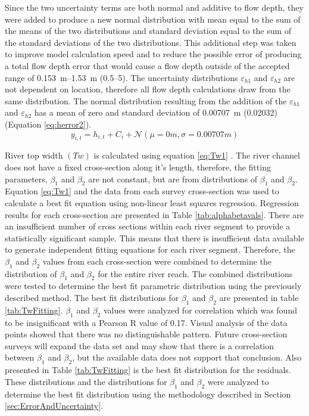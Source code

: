 Since the two uncertainty terms are both normal and additive to flow depth, they were added to produce a new normal distribution with mean equal to the sum of the means of the two distributions and standard deviation equal to the sum of the standard deviations of the two distributions.  This additional step was taken to improve model calculation speed and to reduce the possible error of producing a total flow depth error that would cause a flow depth outside of the accepted range of \SIrange{0.153}{1.53}{\meter} (\SIrange{0.5}{5}{\foot}).  The uncertainty distributions $ \varepsilon_{h1} $ and $ \varepsilon_{h2} $ are not dependent on location, therefore all flow depth calculations draw from the same distribution.  The normal distribution resulting from the addition of the $ \varepsilon_{h1} $ and $ \varepsilon_{h2} $ has a mean of zero and standard deviation of \SI{0.00707}{\meter} (\SI{0.02032}{\foot}) (Equation \ref{eq:herror2}).  
\begin{equation}
	y_{i,t}=h_{i,t}+C_{i}+\mathcal{N} \left( \mu=0m, \sigma=0.00707m \right)
	\label{eq:herror2}
\end{equation}

River top width $ \left( Tw \right)  $ is calculated using equation \ref{eq:Tw1}  \parencite{Buhman2002,Gates1996}. The river channel does not have a fixed cross-section along it's length, therefore, the fitting parameters, $ \beta_1 $ and $ \beta_2 $ are not constant, but are from distributions of  $ \beta_1 $ and $ \beta_2 $.  Equation \ref{eq:Tw1} and the data from each survey cross-section was used to calculate a best fit equation using non-linear least squares regression.  Regression results for each cross-section are presented in Table \ref{tab:alphabetavals}.  There are an insufficient number of cross sections within each river segment to provide a statistically significant sample.  This means that there is insufficient data available to generate independent fitting equations for each river segment.  Therefore, the $ \beta_1 $ and $ \beta_2 $ values from each cross-section were combined to determine the distribution of $ \beta_1 $ and $ \beta_2 $ for the entire river reach.  The combined distributions were tested to determine the best fit parametric distribution using the previously described method.  The best fit distributions for $ \beta_1 $ and $ \beta_2 $ are presented in table \ref{tab:TwFitting}.  $ \beta_1 $ and $ \beta_2 $ values were analyzed for correlation which was found to be insignificant with a Pearson R value of 0.17.  Visual analysis of the data points showed that there was no distinguishable pattern.  Future cross-section surveys will expand the data set and may show that there is a correlation between $ \beta_1 $ and $ \beta_2 $, but the available data does not support that conclusion.  Also presented in Table \ref{tab:TwFitting} is the best fit distribution for the residuals.  These distributions and the distributions for $ \beta_1 $ and $ \beta_2 $ were analyzed to determine the best fit distribution using the methodology described in Section \ref{sec:ErrorAndUncertainty}.


